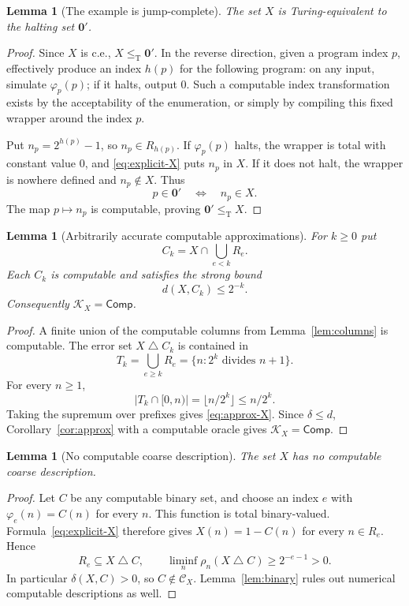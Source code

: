 \documentclass[11pt,a4paper]{article}
\newcommand{\leT}{\leq_{\mathrm T}}
\newcommand{\CD}[1]{\mathcal C_{#1}}
\newcommand{\Core}[1]{\mathcal K_{#1}}
\newcommand{\Comp}{\mathsf{Comp}}
\newcommand{\sdelta}{\mathbin{\triangle}}
\newtheorem{lemma}[theorem]{Lemma}
\theoremstyle{definition}\newtheorem{definition}[theorem]{Definition}
\theoremstyle{remark}\newtheorem{remark}[theorem]{Remark}
\begin{document}
\begin{lemma}[The example is jump-complete]\label{lem:complete}
The set $X$ is Turing-equivalent to the halting set $\mathbf0'$.
\end{lemma}
\begin{proof}
Since $X$ is c.e., $X\leT\mathbf0'$. In the reverse direction, given a program index $p$, effectively produce an index $h(p)$ for the following program: on any input, simulate $\varphi_p(p)$; if it halts, output $0$. Such a computable index transformation exists by the acceptability of the enumeration, or simply by compiling this fixed wrapper around the index $p$.

Put $n_p=2^{h(p)}-1$, so $n_p\in R_{h(p)}$. If $\varphi_p(p)$ halts, the wrapper is total with constant value $0$, and \eqref{eq:explicit-X} puts $n_p$ in $X$. If it does not halt, the wrapper is nowhere defined and $n_p\notin X$. Thus
\[
               p\in\mathbf0'\quad\Longleftrightarrow\quad n_p\in X.
\]
The map $p\mapsto n_p$ is computable, proving $\mathbf0'\leT X$.
\end{proof}

\begin{lemma}[Arbitrarily accurate computable approximations]\label{lem:approx-X}
For $k\ge0$ put
\[
                   C_k=X\cap\bigcup_{e<k}R_e.
\]
Each $C_k$ is computable and satisfies the strong bound
\begin{equation}\label{eq:approx-X}
                  d(X,C_k)\le2^{-k}.
\end{equation}
Consequently $\Core X=\Comp$.
\end{lemma}
\begin{proof}
A finite union of the computable columns from Lemma~\ref{lem:columns} is computable. The error set $X\sdelta C_k$ is contained in
\[
 T_k=\bigcup_{e\ge k}R_e=\{n:2^k\text{ divides }n+1\}.
\]
For every $n\ge1$,
\begin{equation}\label{eq:tail-count}
 |T_k\cap[0,n)|=\lfloor n/2^k\rfloor\le n/2^k.
\end{equation}
Taking the supremum over prefixes gives \eqref{eq:approx-X}. Since $\delta\le d$, Corollary~\ref{cor:approx} with a computable oracle gives $\Core X=\Comp$.
\end{proof}

\begin{lemma}[No computable coarse description]\label{lem:no-computable}
The set $X$ has no computable coarse description.
\end{lemma}
\begin{proof}
Let $C$ be any computable binary set, and choose an index $e$ with $\varphi_e(n)=C(n)$ for every $n$. This function is total binary-valued. Formula~\eqref{eq:explicit-X} therefore gives $X(n)=1-C(n)$ for every $n\in R_e$. Hence
\[
 R_e\subseteq X\sdelta C,
 \qquad
 \liminf_n\rho_n(X\sdelta C)\ge2^{-e-1}>0.
\]
In particular $\delta(X,C)>0$, so $C\notin\CD X$. Lemma~\ref{lem:binary} rules out numerical computable descriptions as well.
\end{proof}
\end{document}
